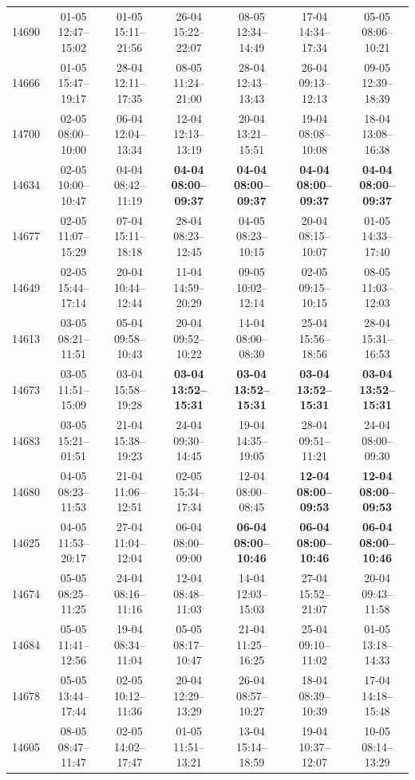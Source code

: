 \begin{table}[htbp]
\begin{tabular}{|r|c|c|c|c|c|c|}
14690 & 01-05 12:47--15:02 & 01-05 15:11--21:56 & 26-04 15:22--22:07 & 08-05 12:34--14:49 & 17-04 14:34--17:34 & 05-05 08:06--10:21 \\ 
14666 & 01-05 15:47--19:17 & 28-04 12:11--17:35 & 08-05 11:24--21:00 & 28-04 12:43--13:43 & 26-04 09:13--12:13 & 09-05 12:39--18:39 \\ 
14700 & 02-05 08:00--10:00 & 06-04 12:04--13:34 & 12-04 12:13--13:19 & 20-04 13:21--15:51 & 19-04 08:08--10:08 & 18-04 13:08--16:38 \\ 
14634 & 02-05 10:00--10:47 & 04-04 08:42--11:19 & \textbf{04-04 08:00--09:37} & \textbf{04-04 08:00--09:37} & \textbf{04-04 08:00--09:37} & \textbf{04-04 08:00--09:37} \\ 
14677 & 02-05 11:07--15:29 & 07-04 15:11--18:18 & 28-04 08:23--12:45 & 04-05 08:23--10:15 & 20-04 08:15--10:07 & 01-05 14:33--17:40 \\ 
14649 & 02-05 15:44--17:14 & 20-04 10:44--12:44 & 11-04 14:59--20:29 & 09-05 10:02--12:14 & 02-05 09:15--10:15 & 08-05 11:03--12:03 \\ 
14613 & 03-05 08:21--11:51 & 05-04 09:58--10:43 & 20-04 09:52--10:22 & 14-04 08:00--08:30 & 25-04 15:56--18:56 & 28-04 15:31--16:53 \\ 
14673 & 03-05 11:51--15:09 & 03-04 15:58--19:28 & \textbf{03-04 13:52--15:31} & \textbf{03-04 13:52--15:31} & \textbf{03-04 13:52--15:31} & \textbf{03-04 13:52--15:31} \\ 
14683 & 03-05 15:21--01:51 & 21-04 15:38--19:23 & 24-04 09:30--14:45 & 19-04 14:35--19:05 & 28-04 09:51--11:21 & 24-04 08:00--09:30 \\ 
14680 & 04-05 08:23--11:53 & 21-04 11:06--12:51 & 02-05 15:34--17:34 & 12-04 08:00--08:45 & \textbf{12-04 08:00--09:53} & \textbf{12-04 08:00--09:53} \\ 
14625 & 04-05 11:53--20:17 & 27-04 11:04--12:04 & 06-04 08:00--09:00 & \textbf{06-04 08:00--10:46} & \textbf{06-04 08:00--10:46} & \textbf{06-04 08:00--10:46} \\ 
14674 & 05-05 08:25--11:25 & 24-04 08:16--11:16 & 12-04 08:48--11:03 & 14-04 12:03--15:03 & 27-04 15:52--21:07 & 20-04 09:43--11:58 \\ 
14684 & 05-05 11:41--12:56 & 19-04 08:34--11:04 & 05-05 08:17--10:47 & 21-04 11:25--16:25 & 25-04 09:10--11:02 & 01-05 13:18--14:33 \\ 
14678 & 05-05 13:44--17:44 & 02-05 10:12--11:36 & 20-04 12:29--13:29 & 26-04 08:57--10:27 & 18-04 08:39--10:39 & 17-04 14:18--15:48 \\ 
14605 & 08-05 08:47--11:47 & 02-05 14:02--17:47 & 01-05 11:51--13:21 & 13-04 15:14--18:59 & 19-04 10:37--12:07 & 10-05 08:14--13:29 \\ 

\end{tabular}
\end{table}
